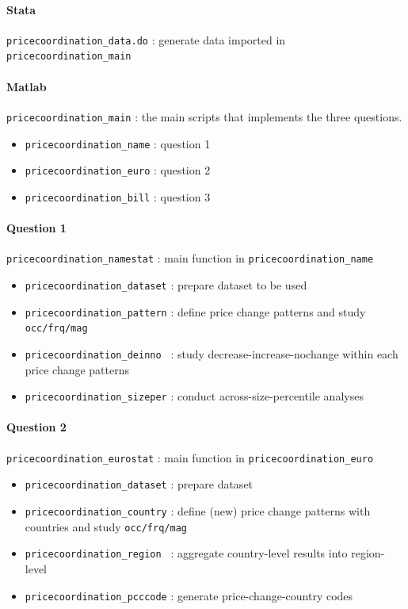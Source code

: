 \paragraph{Stata} \texttt{pricecoordination\_data.do} : generate data imported in \texttt{pricecoordination\_main}

\paragraph{Matlab} \texttt{pricecoordination\_main} : the main scripts that implements the three questions.
\begin{itemize}
	\item \texttt{pricecoordination\_name} : question 1
	\item \texttt{pricecoordination\_euro} : question 2
	\item \texttt{pricecoordination\_bill} : question 3
\end{itemize}

\paragraph{Question 1} \texttt{pricecoordination\_namestat} : main function in \texttt{pricecoordination\_name}
\begin{itemize}
	\item \texttt{pricecoordination\_dataset} : prepare dataset to be used
	\item \texttt{pricecoordination\_pattern} : define price change patterns and study \texttt{occ/frq/mag}
	\item \texttt{pricecoordination\_deinno } : study decrease-increase-nochange within each price change patterns
	\item \texttt{pricecoordination\_sizeper} : conduct across-size-percentile analyses
\end{itemize}

\paragraph{Question 2} \texttt{pricecoordination\_eurostat} : main function in \texttt{pricecoordination\_euro}
\begin{itemize}
	\item \texttt{pricecoordination\_dataset} : prepare dataset
	\item \texttt{pricecoordination\_country} : define (new) price change patterns with countries and study \texttt{occ/frq/mag}
	\item \texttt{pricecoordination\_region } : aggregate country-level results into region-level
	\item \texttt{pricecoordination\_pcccode} : generate price-change-country codes
\end{itemize}


